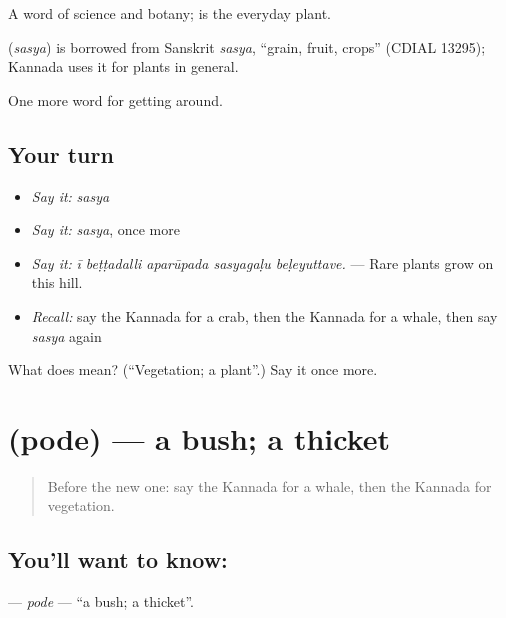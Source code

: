 A word of science and botany;  is the everyday plant.

\begin{cousinweb}
\textbf{} (\emph{sasya}) is borrowed from Sanskrit \emph{sasya}, \textquotedblleft{}grain, fruit, crops\textquotedblright{} (CDIAL 13295); Kannada uses it for plants in general.
\end{cousinweb}

\begin{grammarlens}[title={What you've built}]
One more word for getting around.
\end{grammarlens}

\subsection*{Your turn}
\begin{itemize}
\raggedright
  \item \emph{Say it:} \emph{sasya}
  \item \emph{Say it:} \emph{sasya}, once more
  \item \emph{Say it:} \emph{ī beṭṭadalli aparūpada sasyagaḷu beḷeyuttave.} — Rare plants grow on this hill.
  \item \emph{Recall:} say the Kannada for a crab, then the Kannada for a whale, then say \emph{sasya} again
\end{itemize}

\begin{tcolorbox}[breakable,colback=teal!4,colframe=teal!35!black,title={Before you move on}]
What does  mean? (\textquotedblleft{}Vegetation; a plant\textquotedblright{}.) Say it once more.
\end{tcolorbox}
\section[\texorpdfstring{\kn{ಪೊದೆ} (pode)}{ಪೊದೆ (pode)}]{ (pode) — a bush; a thicket}

\label{lesson:KA-C479-pode}



\begin{quote}
Before the new one: say the Kannada for a whale, then the Kannada for vegetation.
\end{quote}

\subsection*{You'll want to know: }
\textbf{} — \emph{pode} — \textquotedblleft{}a bush; a thicket\textquotedblright{}.

